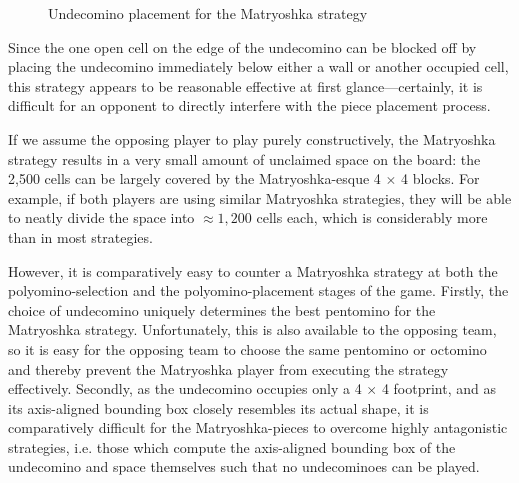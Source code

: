 \documentclass{scrartcl}
\begin{document}
\begin{figure}[h]
\centering
{}
\caption{Undecomino placement for the Matryoshka strategy}\label{fig:matryoshka2}
\end{figure}

Since the one open cell on the edge of the undecomino can be blocked off by placing the undecomino immediately below either a wall or another occupied cell, this strategy appears to be reasonable effective at first glance---certainly, it is difficult for an opponent to directly interfere with the piece placement process.

If we assume the opposing player to play purely constructively, the Matryoshka strategy results in a very small amount of unclaimed space on the board: the 2,500 cells can be largely covered by the Matryoshka-esque 4 $\times$ 4 blocks. For example, if both players are using similar Matryoshka strategies, they will be able to neatly divide the space into $\approx 1,200$ cells each, which is considerably more than in most strategies.

However, it is comparatively easy to counter a Matryoshka strategy at both the polyomino-selection and the polyomino-placement stages of the game. Firstly, the choice of undecomino uniquely determines the best pentomino for the Matryoshka strategy. Unfortunately, this is also available to the opposing team, so it is easy for the opposing team to choose the same pentomino or octomino and thereby prevent the Matryoshka player from executing the strategy effectively. Secondly, as the undecomino occupies only a 4 $\times$ 4 footprint, and as its axis-aligned bounding box closely resembles its actual shape, it is comparatively difficult for the Matryoshka-pieces to overcome highly antagonistic strategies, i.e. those which compute the axis-aligned bounding box of the undecomino and space themselves such that no undecominoes can be played.
\end{document}
